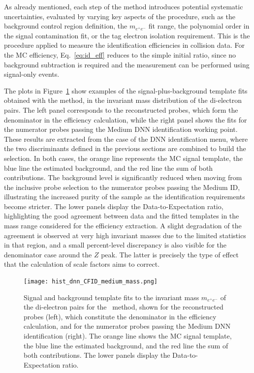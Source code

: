 As already mentioned, each step of the method introduces potential systematic uncertainties, evaluated by varying key aspects of the procedure, such as the background control region definition, the $m_{e^+e^-}$ fit range, the polynomial order in the signal contamination fit, or the tag electron isolation requirement. 
This is the procedure applied to measure the identification efficiencies in collision data. For the MC efficiency, Eq.~\ref{eq:id_eff} reduces to the simple initial ratio, since no background subtraction is required and the measurement can be performed using signal-only events.

The plots in Figure~\ref{fig:zmass_fit_dnn_medium} show examples of the signal-plus-background template fits obtained with the \zmass method, in the invariant mass distribution of the di-electron pairs. The left panel corresponds to the reconstructed probes, which form the denominator in the efficiency calculation, while the right panel shows the fits for the numerator probes passing the Medium DNN identification working point. These results are extracted from the case of the DNN identification menu, where the two discriminants defined in the previous sections are combined to build the selection. In both cases, the orange line represents the MC signal template, the blue line the estimated background, and the red line the sum of both contributions. The background level is significantly reduced when moving from the inclusive probe selection to the numerator probes passing the Medium ID, illustrating the increased purity of the sample as the identification requirements become stricter. 
The lower panels display the Data-to-Expectation ratio, highlighting the good agreement between data and the fitted templates in the mass range considered for the efficiency extraction. A slight degradation of the agreement is observed at very high invariant masses due to the limited statistics in that region, and a small percent-level discrepancy is also visible for the denominator case around the $Z$ peak. The latter is precisely the type of effect that the calculation of scale factors aims to correct.

\begin{figure}[htbp]
  \centering
  \texttt{[image: hist\_dnn\_CFID\_medium\_mass.png]}
  \caption{
    Signal and background template fits to the invariant mass $m_{e^{+}e^{-}}$ of the di-electron pairs for the \zmass\ method, shown for the reconstructed probes (left), which constitute the denominator in the efficiency calculation, and for the numerator probes passing the Medium DNN identification (right). The orange line shows the MC signal template, the blue line the estimated background, and the red line the sum of both contributions. The lower panels display the Data-to-Expectation ratio.}
  \label{fig:zmass_fit_dnn_medium}
\end{figure}



